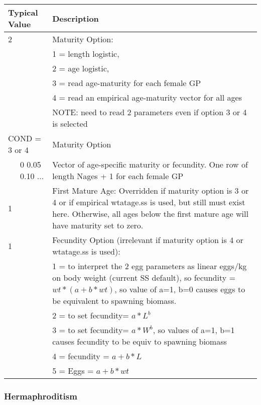 \begin{longtable}{p{0.5cm} p{2cm} p{12cm}}
		\multicolumn{2}{l}{Typical Value} & Description \\
		\hline
	    2 & & Maturity Option: \\
	     & & 1 = length logistic,\\
	     & & 2 = age logistic,\\
	     & & 3 = read age-maturity for each female GP\\
	     & & 4 = read an empirical age-maturity vector for all ages\\
	     & & NOTE: need to read 2 parameters even if option 3 or 4 is selected \\
	   \hline

	   \multicolumn{2}{l}{COND = 3 or 4} & Maturity Option\\
	   & 0 0.05 0.10 ... & Vector of age-specific maturity or fecundity.  One row of length Nages + 1 for each female GP\\
	   \hline
	   
	   1 & & First Mature Age: Overridden if maturity option is 3 or 4 or if empirical wtatage.ss is used, but still must exist here.  Otherwise, all ages below the first mature age will have maturity set to zero.\\
	   \hline	  

	   1 & & Fecundity Option (irrelevant if maturity option is 4 or wtatage.ss is used):\\
	     & & 1 = to  interpret the 2 egg parameters as linear eggs/kg on body weight (current SS default),  so fecundity = $wt * (a+b*wt)$, so value of a=1, b=0 causes eggs to be equivalent to spawning biomass.\\
	     & & 2 = to set fecundity= $a*L^ b$\\
	     & & 3 = to set fecundity= $a*W^ b$, so values of a=1, b=1 causes fecundity to be equiv to spawning biomass\\
	     & & 4 = fecundity = $a+b*L$\\
	     & & 5 = Eggs = $a+b*wt$\\
	  \hline
	\end{longtable}

\subsubsection{Hermaphroditism}

